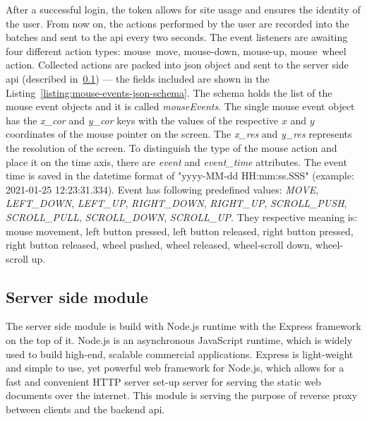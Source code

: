 After a successful login, the token allows for site usage and ensures the identity of the user.
From now on, the actions performed by the user are recorded into the batches and sent to the \gls{api} every two seconds.
The event listeners are awaiting four different action types: \mbox{mouse move}, \mbox{mouse-down}, \mbox{mouse-up}, \mbox{mouse wheel} action.
Collected actions are packed into \gls{json} object and sent to the server side \gls{api} (described in~\ref{subsec:server-side-module}) --- the fields included are shown in the Listing~\ref{listing:mouse-events-json-schema}.
The schema holds the list of the mouse event objects and it is called \textit{mouseEvents}.
The single mouse event object has the \textit{x\_cor} and \textit{y\_cor} keys with the values of the respective $x$ and $y$ coordinates of the mouse pointer on the screen.
The \textit{x\_res} and \textit{y\_res} represents the resolution of the screen.
To distinguish the type of the mouse action and place it on the time axis, there are \textit{event} and \textit{event\_time} attributes.
The event time is saved in the datetime format of "yyyy-MM-dd HH:mm:ss.SSS" (example: 2021-01-25 12:23:31.334).
Event has following predefined values: \textit{MOVE}, \textit{LEFT\_DOWN}, \textit{LEFT\_UP}, \textit{RIGHT\_DOWN}, \textit{RIGHT\_UP}, \textit{SCROLL\_PUSH}, \textit{SCROLL\_PULL}, \textit{SCROLL\_DOWN}, \textit{SCROLL\_UP}\@.
They respective meaning is: mouse movement, left button pressed, left button released, right button pressed, right button released, wheel pushed, wheel released, wheel-scroll down, wheel-scroll up.



\subsection{Server side module}\label{subsec:server-side-module}
The server side module is build with Node.js runtime with the Express framework on the top of it.
Node.js is an asynchronous JavaScript runtime, which is widely used to build high-end, scalable commercial applications.
Express is light-weight and simple to use, yet powerful web framework for Node.js, which allows for a fast and convenient HTTP server set-up server for serving the static web documents over the internet.
This module is serving the purpose of reverse proxy between clients and the backend \gls{api}.

